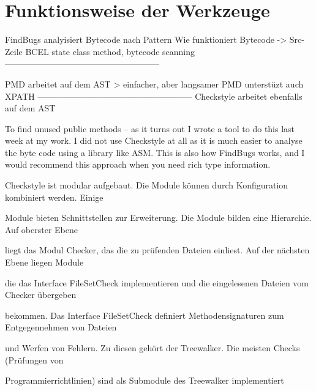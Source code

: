 \section{Funktionsweise der Werkzeuge}

FindBugs analyisiert Bytecode nach Pattern
Wie funktioniert Bytecode -> Src-Zeile
BCEL
state class method, bytecode scanning
------------------------------------------------------

PMD arbeitet auf dem AST > einfacher, aber langsamer
PMD unterstüzt auch XPATH
------------------------------------------------------
Checkstyle arbeitet ebenfalls auf dem AST


To find unused public methods -- as it turns out I wrote a tool to do this last week at my work. I did not use Checkstyle at all as it is much easier to analyse the byte code using a library like ASM. This is also how FindBugs works, and I would recommend this approach when you need rich type information. 


Checkstyle ist modular aufgebaut. Die Module können durch Konfiguration kombiniert werden. Einige 

Module bieten Schnittstellen zur Erweiterung. Die Module bilden eine Hierarchie. Auf oberster Ebene 

liegt das Modul Checker, das die zu prüfenden Dateien einliest. Auf der nächsten Ebene liegen Module 

die das Interface FileSetCheck implementieren und die eingelesenen Dateien vom Checker übergeben 

bekommen. Das Interface FileSetCheck definiert Methodensignaturen zum Entgegennehmen von Dateien 

und Werfen von Fehlern. Zu diesen gehört der Treewalker. Die meisten Checks (Prüfungen von 

Programmierrichtlinien) sind als Submodule des Treewalker implementiert



